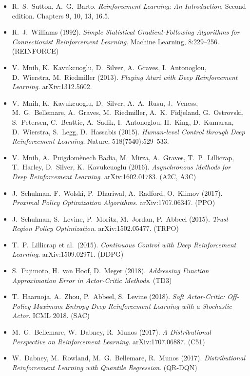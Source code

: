 \documentclass[11pt,a4paper]{article}
\theoremstyle{definition}
\theoremstyle{plain}
\theoremstyle{remark}
\begin{document}
\begin{itemize}
    \item R.\ S.\ Sutton, A.\ G.\ Barto. \emph{Reinforcement Learning: An Introduction}. Second edition. Chapters 9, 10, 13, 16.5.
    \item R.\ J.\ Williams (1992). \emph{Simple Statistical Gradient-Following Algorithms for Connectionist Reinforcement Learning}. Machine Learning, 8:229--256. (REINFORCE)
    \item V.\ Mnih, K.\ Kavukcuoglu, D.\ Silver, A.\ Graves, I.\ Antonoglou, D.\ Wierstra, M.\ Riedmiller (2013). \emph{Playing Atari with Deep Reinforcement Learning}. arXiv:1312.5602.
    \item V.\ Mnih, K.\ Kavukcuoglu, D.\ Silver, A.\ A.\ Rusu, J.\ Veness, M.\ G.\ Bellemare, A.\ Graves, M.\ Riedmiller, A.\ K.\ Fidjeland, G.\ Ostrovski, S.\ Petersen, C.\ Beattie, A.\ Sadik, I.\ Antonoglou, H.\ King, D.\ Kumaran, D.\ Wierstra, S.\ Legg, D.\ Hassabis (2015). \emph{Human-level Control through Deep Reinforcement Learning}. Nature, 518(7540):529--533.
    \item V.\ Mnih, A.\ Puigdom\`enech Badia, M.\ Mirza, A.\ Graves, T.\ P.\ Lillicrap, T.\ Harley, D.\ Silver, K.\ Kavukcuoglu (2016). \emph{Asynchronous Methods for Deep Reinforcement Learning}. arXiv:1602.01783. (A2C, A3C)
    \item J.\ Schulman, F.\ Wolski, P.\ Dhariwal, A.\ Radford, O.\ Klimov (2017). \emph{Proximal Policy Optimization Algorithms}. arXiv:1707.06347. (PPO)
    \item J.\ Schulman, S.\ Levine, P.\ Moritz, M.\ Jordan, P.\ Abbeel (2015). \emph{Trust Region Policy Optimization}. arXiv:1502.05477. (TRPO)
    \item T.\ P.\ Lillicrap et al.\ (2015). \emph{Continuous Control with Deep Reinforcement Learning}. arXiv:1509.02971. (DDPG)
    \item S.\ Fujimoto, H.\ van Hoof, D.\ Meger (2018). \emph{Addressing Function Approximation Error in Actor-Critic Methods}. (TD3)
    \item T.\ Haarnoja, A.\ Zhou, P.\ Abbeel, S.\ Levine (2018). \emph{Soft Actor-Critic: Off-Policy Maximum Entropy Deep Reinforcement Learning with a Stochastic Actor}. ICML 2018. (SAC)
    \item M.\ G.\ Bellemare, W.\ Dabney, R.\ Munos (2017). \emph{A Distributional Perspective on Reinforcement Learning}. arXiv:1707.06887. (C51)
    \item W.\ Dabney, M.\ Rowland, M.\ G.\ Bellemare, R.\ Munos (2017). \emph{Distributional Reinforcement Learning with Quantile Regression}. (QR-DQN)

\end{itemize}
\end{document}
